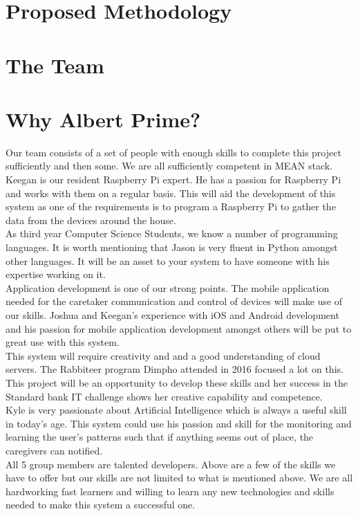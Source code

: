 \documentclass[12pt]{article}
\begin{document}
	\newpage
	\section{Proposed Methodology}
	
	\newpage
	\section{The Team}
	
	\newpage
	\section{Why Albert Prime?}
	
	Our team consists of a set of people with enough skills to complete this project sufficiently and then some. We are all sufficiently competent in MEAN stack. \\ 
	
	Keegan is our resident Raspberry Pi expert. He has a passion for Raspberry Pi and works with them on a regular basis. This will aid the development of this system as one of the requirements is to program a Raspberry Pi to gather the data from the devices around the house.\\
	
	As third year Computer Science Students, we know a number of programming languages. It is worth mentioning that Jason is very fluent in Python amongst other languages. It will be an asset to your system to have someone with his expertise working on it.\\
	
	
	Application development is one of our strong points. The mobile application needed for the caretaker communication and control of devices will make use of our skills. Joshua and Keegan's experience with iOS and Android development and his passion for mobile application development amongst others will be put to great use with this system.\\
	
	This system will require creativity and and a good understanding of cloud servers. The Rabbiteer program Dimpho attended in 2016 focused a lot on this. This project will be an opportunity to develop these skills and her success in the Standard bank IT challenge shows her creative capability and competence.\\
	
	Kyle is very passionate about Artificial Intelligence which is always a useful skill in today's age. This system could use his passion and skill for the monitoring and learning the user's patterns such that if anything seems out of place, the caregivers can notified.\\
	
	All 5 group members are talented developers. Above are a few of the skills we have to offer but our skills are not limited to what is mentioned above. We are all hardworking fast learners and willing to learn any new technologies and skills needed to make this system a successful one. 
	\newpage

\end{document}
